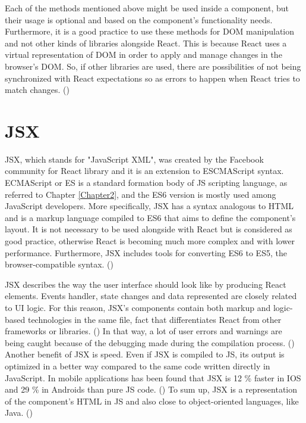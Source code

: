 Each of the methods mentioned above might be used inside a component, but their usage is optional and based on the component's functionality needs. Furthermore, it is a good practice to use these methods for DOM manipulation and not other kinds of libraries alongside React. This is because React uses a virtual representation of DOM in order to apply and manage changes in the browser's DOM. So, if other libraries are used, there are possibilities of not being synchronized with React expectations so as errors to happen when React tries to match changes. (\cite{Reference13}) \par

\section{JSX}

JSX, which stands for "JavaScript XML", was created by the Facebook community for React library and it is an extension to ESCMAScript syntax. ECMAScript or ES is a standard formation body of JS scripting language, as referred to Chapter \ref{Chapter2}, and the ES6 version is mostly used among JavaScript developers. More specifically, JSX has a syntax analogous to HTML and is a markup language compiled to ES6 that aims to define the component's layout. It is not necessary to be used alongside with React but is considered as good practice, otherwise React is becoming much more complex and with lower performance. Furthermore, JSX includes tools for converting ES6 to ES5, the browser-compatible syntax. (\cite{Reference13}) \par

JSX describes the way the user interface should look like by producing React elements. Events handler, state changes and data represented are closely related to UI logic. For this reason, JSX's components contain both markup and logic-based technologies in the same file, fact that differentiates React from other frameworks or libraries. (\cite{Reference16}) In that way, a lot of user errors and warnings are being caught because of the debugging made during the compilation process. (\cite{Reference10}) Another benefit of JSX is speed. Even if JSX is compiled to JS, its output is optimized in a better way compared to the same code written directly in JavaScript. In mobile applications has been found that JSX is 12 \% faster in IOS and 29 \% in Androids than pure JS code. (\cite{Reference14}) To sum up, JSX is a representation of the component's HTML in JS and also close to object-oriented languages, like Java. (\cite{Reference13})

